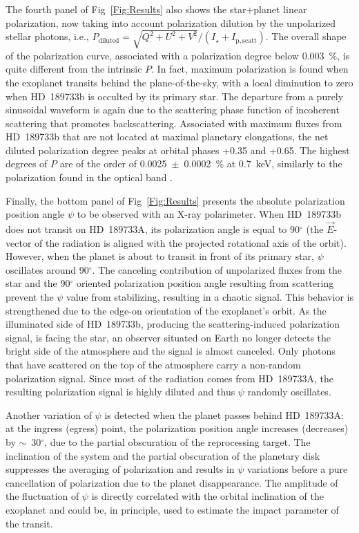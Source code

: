 \documentclass[iop]{emulateapj}
\begin{document}
The fourth panel of Fig~\ref{Fig:Results} also shows the star+planet linear polarization, now taking into account polarization
dilution by the unpolarized stellar photons, i.e., $P_\mathrm{diluted}=\sqrt{Q^2+U^2+V^2}/(I_\star+I_\mathrm{p,scatt})$. The overall
shape of the polarization curve, associated with a polarization degree below 0.003~\%, is quite different from the intrinsic $P$. 
In fact, maximum polarization is found when the exoplanet transits behind the plane-of-the-sky, with a local diminution to zero when HD~189733b
is occulted by its primary star. The departure from a purely sinusoidal waveform is again due to the scattering phase function of incoherent
scattering that promotes backscattering. Associated with maximum fluxes from HD~189733b that are not located at maximal planetary elongations,
the net diluted polarization degree peaks at orbital phases +0.35 and +0.65. The highest degrees of $P$ are of the order of 0.0025~$\pm$~0.0002~\%
at 0.7~keV, similarly to the polarization found in the optical band \citep{Carciofi2005}.

Finally, the bottom panel of Fig~\ref{Fig:Results} presents the absolute polarization position angle $\psi$ to be observed with an X-ray polarimeter.
When HD~189733b does not transit on HD~189733A, its polarization angle is equal to 90$^{\circ}$ (the $\vec E$-vector of the radiation is aligned 
with the projected rotational axis of the orbit). However, when the planet is about to transit in front of its primary star, $\psi$ oscillates
around 90$^{\circ}$. The canceling contribution of unpolarized fluxes from the star and the 90$^{\circ}$ oriented polarization position angle 
resulting from scattering prevent the $\psi$ value from stabilizing, resulting in a chaotic signal. This behavior is strengthened due to the edge-on 
orientation of the exoplanet's orbit. As the illuminated side of HD~189733b, producing the scattering-induced polarization signal, is facing the 
star, an observer situated on Earth no longer detects the bright side of the atmosphere and the signal is almost canceled. Only photons that 
have scattered on the top of the atmosphere carry a non-random polarization signal. Since most of the radiation comes from HD~189733A, 
the resulting polarization signal is highly diluted and thus $\psi$ randomly oscillates. 

Another variation of $\psi$ is detected when the planet passes behind HD~189733A: at the ingress (egress) point, the polarization position angle 
increases (decreases) by $\sim$~30$^{\circ}$, due to the partial obscuration of the reprocessing target. The inclination of the system and the partial 
obscuration of the planetary disk suppresses the averaging of polarization and results in $\psi$ variations before a pure cancellation of polarization 
due to the planet disappearance. The amplitude of the fluctuation of $\psi$ is directly correlated with the orbital inclination of the exoplanet and 
could be, in principle, used to estimate the impact parameter of the transit.
\end{document}
